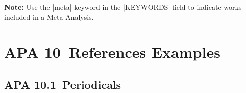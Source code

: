 \documentclass[paper=a4]{article}
\begin{document}
\newpage
\begin{refsection}

\nocite{9.51:1,9.51:2}

\printbibliography[title={APA 9.51--Annotated Bibliographies}]

\end{refsection}
\newpage
\begin{refsection}

\nocite{9.52:1,9.52:2,9.52:3,9.52:4}

\printbibliography[title={APA 9.52--References Included in a Meta-Analysis}]

\noindent\textbf{Note:} Use the |meta| keyword in the |KEYWORDS| field to
indicate works included in a Meta-Analysis.

\end{refsection}
\newpage
\section{APA 10--References Examples}
\subsection{APA 10.1--Periodicals}
\end{document}
